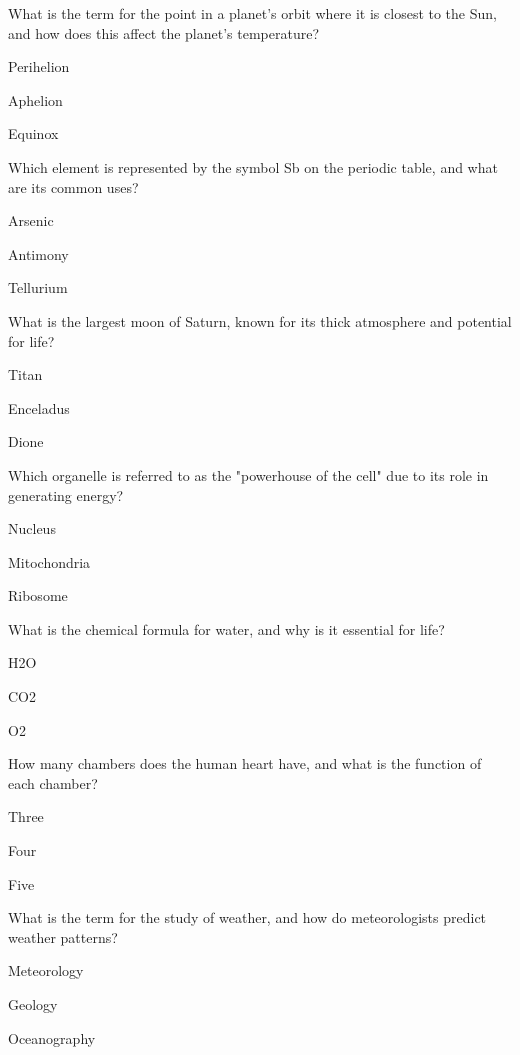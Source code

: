 \begin{enhancedmcq}{What is the term for the point in a planet's orbit where it is closest to the Sun, and how does this affect the planet's temperature?}
\item Perihelion
\item Aphelion
\item Equinox

\end{enhancedmcq}
\begin{enhancedmcq}{Which element is represented by the symbol Sb on the periodic table, and what are its common uses?}
\item Arsenic
\item Antimony
\item Tellurium

\end{enhancedmcq}
\begin{enhancedmcq}{What is the largest moon of Saturn, known for its thick atmosphere and potential for life?}
\item Titan
\item Enceladus
\item Dione

\end{enhancedmcq}
\begin{enhancedmcq}{Which organelle is referred to as the "powerhouse of the cell" due to its role in generating energy?}
\item Nucleus
\item Mitochondria
\item Ribosome

\end{enhancedmcq}
\begin{enhancedmcq}{What is the chemical formula for water, and why is it essential for life?}
\item H2O
\item CO2
\item O2

\end{enhancedmcq}
\begin{enhancedmcq}{How many chambers does the human heart have, and what is the function of each chamber?}
\item Three
\item Four
\item Five

\end{enhancedmcq}
\begin{enhancedmcq}{What is the term for the study of weather, and how do meteorologists predict weather patterns?}
\item Meteorology
\item Geology
\item Oceanography

\end{enhancedmcq}
